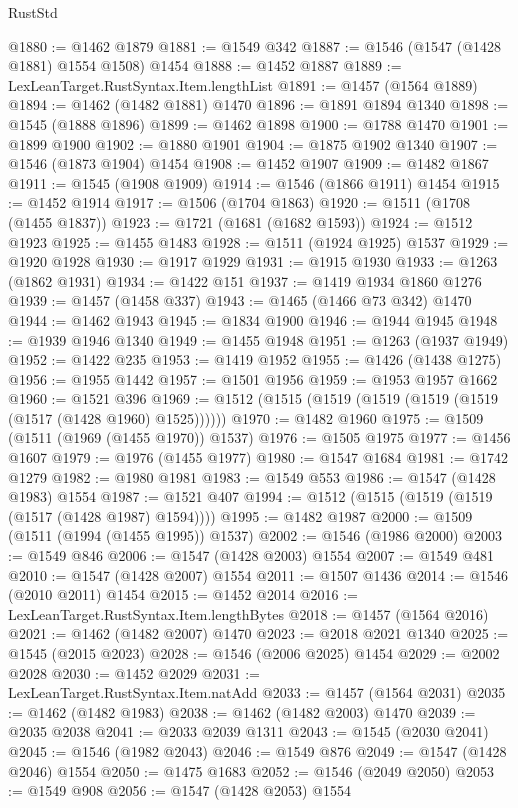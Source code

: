 \begin{lexlean}{RustStd}
\begin{coremodule}
@1880 := @1462 @1879
@1881 := @1549 @342
@1887 := @1546 (@1547 (@1428 @1881) @1554 @1508) @1454
@1888 := @1452 @1887
@1889 := LexLeanTarget.RustSyntax.Item.lengthList
@1891 := @1457 (@1564 @1889)
@1894 := @1462 (@1482 @1881) @1470
@1896 := @1891 @1894 @1340
@1898 := @1545 (@1888 @1896)
@1899 := @1462 @1898
@1900 := @1788 @1470
@1901 := @1899 @1900
@1902 := @1880 @1901
@1904 := @1875 @1902 @1340
@1907 := @1546 (@1873 @1904) @1454
@1908 := @1452 @1907
@1909 := @1482 @1867
@1911 := @1545 (@1908 @1909)
@1914 := @1546 (@1866 @1911) @1454
@1915 := @1452 @1914
@1917 := @1506 (@1704 @1863)
@1920 := @1511 (@1708 (@1455 @1837))
@1923 := @1721 (@1681 (@1682 @1593))
@1924 := @1512 @1923
@1925 := @1455 @1483
@1928 := @1511 (@1924 @1925) @1537
@1929 := @1920 @1928
@1930 := @1917 @1929
@1931 := @1915 @1930
@1933 := @1263 (@1862 @1931)
@1934 := @1422 @151
@1937 := @1419 @1934 @1860 @1276
@1939 := @1457 (@1458 @337)
@1943 := @1465 (@1466 @73 @342) @1470
@1944 := @1462 @1943
@1945 := @1834 @1900
@1946 := @1944 @1945
@1948 := @1939 @1946 @1340
@1949 := @1455 @1948
@1951 := @1263 (@1937 @1949)
@1952 := @1422 @235
@1953 := @1419 @1952
@1955 := @1426 (@1438 @1275)
@1956 := @1955 @1442
@1957 := @1501 @1956
@1959 := @1953 @1957 @1662
@1960 := @1521 @396
@1969 := @1512 (@1515 (@1519 (@1519 (@1519 (@1519 (@1517 (@1428 @1960) @1525))))))
@1970 := @1482 @1960
@1975 := @1509 (@1511 (@1969 (@1455 @1970)) @1537)
@1976 := @1505 @1975
@1977 := @1456 @1607
@1979 := @1976 (@1455 @1977)
@1980 := @1547 @1684
@1981 := @1742 @1279
@1982 := @1980 @1981
@1983 := @1549 @553
@1986 := @1547 (@1428 @1983) @1554
@1987 := @1521 @407
@1994 := @1512 (@1515 (@1519 (@1519 (@1517 (@1428 @1987) @1594))))
@1995 := @1482 @1987
@2000 := @1509 (@1511 (@1994 (@1455 @1995)) @1537)
@2002 := @1546 (@1986 @2000)
@2003 := @1549 @846
@2006 := @1547 (@1428 @2003) @1554
@2007 := @1549 @481
@2010 := @1547 (@1428 @2007) @1554
@2011 := @1507 @1436
@2014 := @1546 (@2010 @2011) @1454
@2015 := @1452 @2014
@2016 := LexLeanTarget.RustSyntax.Item.lengthBytes
@2018 := @1457 (@1564 @2016)
@2021 := @1462 (@1482 @2007) @1470
@2023 := @2018 @2021 @1340
@2025 := @1545 (@2015 @2023)
@2028 := @1546 (@2006 @2025) @1454
@2029 := @2002 @2028
@2030 := @1452 @2029
@2031 := LexLeanTarget.RustSyntax.Item.natAdd
@2033 := @1457 (@1564 @2031)
@2035 := @1462 (@1482 @1983)
@2038 := @1462 (@1482 @2003) @1470
@2039 := @2035 @2038
@2041 := @2033 @2039 @1311
@2043 := @1545 (@2030 @2041)
@2045 := @1546 (@1982 @2043)
@2046 := @1549 @876
@2049 := @1547 (@1428 @2046) @1554
@2050 := @1475 @1683
@2052 := @1546 (@2049 @2050)
@2053 := @1549 @908
@2056 := @1547 (@1428 @2053) @1554

\end{coremodule}
\end{lexlean}

